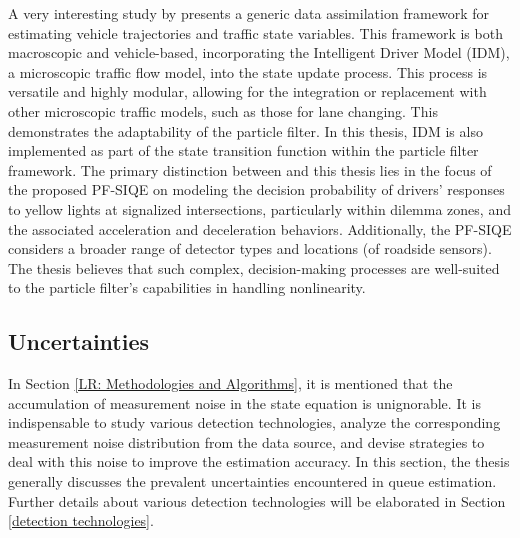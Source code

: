 A very interesting study by \textcite{xie2018generic} presents a generic data assimilation framework for estimating vehicle trajectories and traffic state variables. This framework is both macroscopic and vehicle-based, incorporating the Intelligent Driver Model (IDM), a microscopic traffic flow model, into the state update process. This process is versatile and highly modular, allowing for the integration or replacement with other microscopic traffic models, such as those for lane changing. This demonstrates the adaptability of the particle filter. In this thesis, IDM is also implemented as part of the state transition function within the particle filter framework. The primary distinction between \textcite{xie2018generic} and this thesis lies in the focus of the proposed PF-SIQE on modeling the decision probability of drivers' responses to yellow lights at signalized intersections, particularly within dilemma zones, and the associated acceleration and deceleration behaviors. Additionally, the PF-SIQE considers a broader range of detector types and locations (of roadside sensors).  The thesis believes that such complex, decision-making processes are well-suited to the particle filter's capabilities in handling nonlinearity.


\subsection{Uncertainties}
In Section \ref{LR: Methodologies and Algorithms}, it is mentioned that the accumulation of measurement noise in the state equation is unignorable. It is indispensable to study various detection technologies, analyze the corresponding measurement noise distribution from the data source, and devise strategies to deal with this noise to improve the estimation accuracy. In this section, the thesis generally discusses the prevalent uncertainties encountered in queue estimation. Further details about various detection technologies will be elaborated in Section \ref{detection technologies}.

